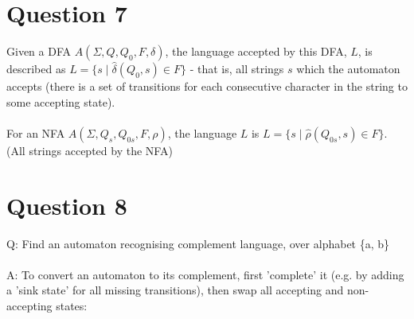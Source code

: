 \documentclass[english]{scrartcl}
\begin{document}
\section*{Question 7}
Given a DFA $A(\Sigma , Q, Q_0, F, \delta)$, the language accepted by this DFA, $L$, is described as
$L = \{ s \; | \; \hat{\delta}( Q_0 , s ) \in F \}$ - that is, all strings $s$ which the automaton accepts (there is a set of transitions for each consecutive character in the string to some accepting state).
\\
\\
For an NFA $A(\Sigma , Q_s, Q_{0s}, F, \rho)$, the language $L$ is $L = \{ s \; | \; \hat{\rho}( Q_{0s} , s ) \in F \}$. (All strings accepted by the NFA)

\section*{Question 8}
Q: Find an automaton recognising complement language, over alphabet \{a, b\}\\
\\
A:
To convert an automaton to its complement, first 'complete' it (e.g. by adding a 'sink state' for all missing transitions), then swap all accepting and non-accepting states:




\end{document}
